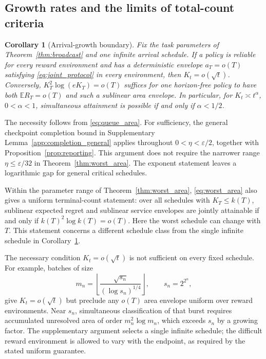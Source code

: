 \documentclass[11pt]{article}
\newtheorem{corollary}[theorem]{Corollary}
\theoremstyle{remark}
\newcommand{\E}{\mathbb E}
\begin{document}
\subsection{Growth rates and the limits of total-count criteria}

\begin{corollary}[Arrival-growth boundary]
\label{cor:growth}
Fix the task parameters of Theorem~\ref{thm:broadcast} and one infinite arrival
schedule. If a policy is reliable for every reward environment and has a
deterministic envelope $a_T=o(T)$ satisfying \eqref{eq:joint_protocol} in
every environment, then $K_t=o(\sqrt t)$. Conversely,
$K_T^2\log(eK_T)=o(T)$ suffices for one horizon-free policy to have both
$\E R_T=o(T)$ and such a sublinear area envelope. In particular, for
$K_t\asymp t^\alpha$, $0<\alpha<1$, simultaneous attainment is possible if
and only if $\alpha<1/2$.
\end{corollary}

The necessity follows from \eqref{eq:queue_area}. For sufficiency, the general
checkpoint completion bound in Supplementary Lemma~\ref{app:completion_general}
applies throughout $0<\eta<\varepsilon/2$, together with
Proposition~\ref{prop:reporting}. This argument does not require the narrower
range $\eta\le\varepsilon/32$ in Theorem~\ref{thm:worst_area}. The exponent
statement leaves a logarithmic gap for general critical schedules.

Within the parameter range of Theorem~\ref{thm:worst_area},
\eqref{eq:worst_area} also gives a uniform terminal-count statement: over all
schedules with $K_T\le k(T)$, sublinear expected regret and sublinear service
envelopes are jointly attainable if and only if
$k(T)^2\log k(T)=o(T)$. Here the worst schedule can change with $T$.
This statement concerns a different schedule class from the single infinite
schedule in Corollary~\ref{cor:growth}.

The necessary condition $K_t=o(\sqrt t)$ is not sufficient on every fixed
schedule. For example, batches of size
\[
 m_n=\left\lfloor\frac{\sqrt{s_n}}{(\log s_n)^{1/4}}\right\rfloor,
 \qquad s_n=2^{2^n},
\]
give $K_t=o(\sqrt t)$ but preclude any $o(T)$ area envelope uniform over
reward environments. Near $s_n$, simultaneous classification of that burst
requires accumulated unresolved area of order $m_n^2\log m_n$, which exceeds
$s_n$ by a growing factor. The supplementary argument selects a single
infinite schedule; the difficult reward environment is allowed to vary with
the endpoint, as required by the stated uniform guarantee.
\end{document}
